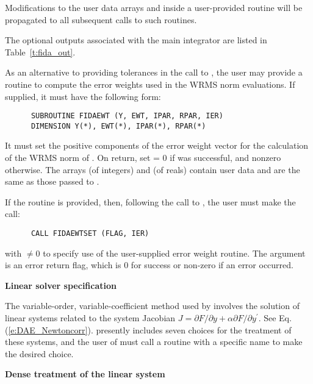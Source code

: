\begin{Steps}
{    Modifications to the user data arrays  and  inside a 
    user-provided routine will be propagated to all subsequent calls to
    such routines.

    The optional outputs associated with the main {\ida} integrator
    are listed in Table~\ref{t:fida_out}.
  }

  As an alternative to providing tolerances in the call to , the
  user may provide a routine to compute the error weights used in the WRMS norm
  evaluations. If supplied, it must have the following form:
\begin{verbatim}
      SUBROUTINE FIDAEWT (Y, EWT, IPAR, RPAR, IER)
      DIMENSION Y(*), EWT(*), IPAR(*), RPAR(*)
\end{verbatim}
  It must set the positive components of the error weight vector  for
  the calculation of the WRMS norm of . On return, set
   = 0 if  was successful, and nonzero otherwise.
  The arrays  (of integers) and  (of reals) contain user data
  and are the same as those passed to .

  If the  routine is provided, then, 
  following the call to , the user must make the call:
\begin{verbatim}
      CALL FIDAEWTSET (FLAG, IER)
\end{verbatim}
  with  $\neq 0$ to specify use of the user-supplied error weight routine.
  The argument  is an error return flag, which is $0$ 
  for success or non-zero if an error occurred.

\item\label{i:fida_lin_solv_spec} {\bf Linear solver specification} 
  
  The variable-order, variable-coefficient  method used by {\ida} involves
  the solution of linear systems related to the system Jacobian
  $J = \partial F / \partial y + \alpha \partial F / \partial y^\prime$.
  See Eq. (\ref{e:DAE_Newtoncorr}).  {\ida} presently includes seven choices for
  the treatment of these systems, and the user of {\fida} must call a routine with
  a specific name to make the desired choice.


  {\s} {\bf Dense treatment of the linear system}
  

\end{Steps}
